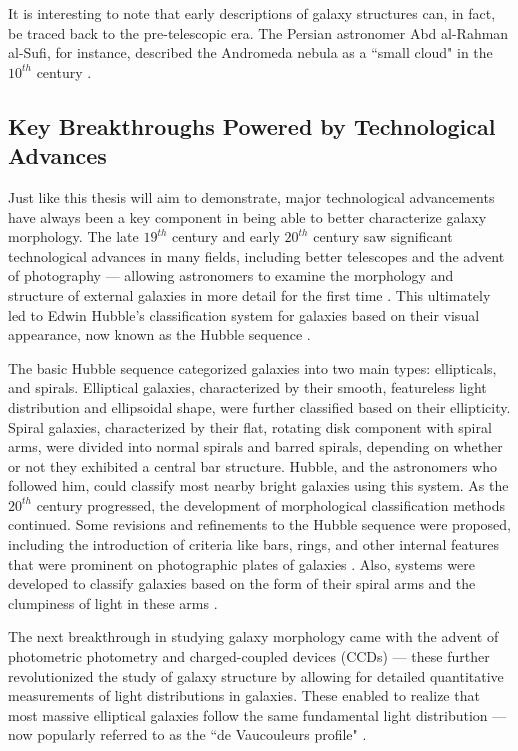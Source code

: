 It is interesting to note that early descriptions of galaxy structures can, in fact, be traced back to the pre-telescopic era. The Persian astronomer Abd al-Rahman al-Sufi, for instance, described the Andromeda nebula as a ``small cloud" in the $10^{th}$ century \citep{kepple_98}. 


\subsection{Key Breakthroughs Powered by Technological Advances} \label{sec_intro:technology}

Just like this thesis will aim to demonstrate, major technological advancements have always been a key component in being able to better characterize galaxy morphology. The late $19^{th}$ century and early $20^{th}$ century saw significant technological advances in many fields, including better telescopes and the advent of photography ---  allowing astronomers to examine the morphology and structure of external galaxies in more detail for the first time \citep[e.g.,][]{wolf_08,lundmark_26}. This ultimately led to Edwin Hubble's classification system for galaxies based on their visual appearance, now known as the Hubble sequence \citep{hubble_1926}. 

The basic Hubble sequence categorized galaxies into two main types: ellipticals, and spirals.  Elliptical galaxies, characterized by their smooth, featureless light distribution and ellipsoidal shape, were further classified based on their ellipticity. Spiral galaxies, characterized by their flat, rotating disk component with spiral arms, were divided into normal spirals and barred spirals, depending on whether or not they exhibited a central bar structure. Hubble, and the astronomers who followed him, could classify most nearby bright galaxies using this system. As the $20^{th}$ century progressed, the development of morphological classification methods continued. Some revisions and refinements to the Hubble sequence were proposed, including the introduction of criteria like bars, rings, and other internal features that were prominent on photographic plates of galaxies \citep[e.g.,][]{devac_59}. Also, systems were developed to classify galaxies based on the form of their spiral arms and the clumpiness of light in these arms \citep[e.g.,][]{vbg_60,vbg_76,elmgreen_87}.

The next breakthrough in studying galaxy morphology came with the advent of photometric photometry and charged-coupled devices (CCDs) --- these further revolutionized the study of galaxy structure by allowing for detailed quantitative measurements of light distributions in galaxies. These enabled \citeauthor{de_vac_48} to realize that most massive elliptical galaxies follow the same fundamental light distribution --- now popularly referred to as the ``de Vaucouleurs profile" \citep{de_vac_48}. 

